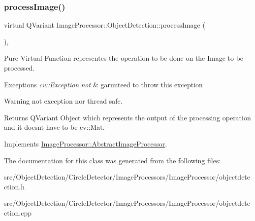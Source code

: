 \subsubsection{\texorpdfstring{process\+Image()}{processImage()}\hspace{0.1cm}{\footnotesize\ttfamily [2/2]}}
{\footnotesize\ttfamily virtual Q\+Variant Image\+Processor\+::\+Object\+Detection\+::process\+Image (\begin{DoxyParamCaption}{ }\end{DoxyParamCaption})\hspace{0.3cm}{\ttfamily [override]}, {\ttfamily [virtual]}}



Pure Virtual Function representes the operation to be done on the Image to be processed. 


\begin{DoxyExceptions}{Exceptions}
{\em cv\+::\+Exception.\+not} & garunteed to throw this exception \\
\hline
\end{DoxyExceptions}
\begin{DoxyWarning}{Warning}
not exception nor thread safe. 
\end{DoxyWarning}
\begin{DoxyReturn}{Returns}
Q\+Variant Object which represents the output of the processing operation and it doesn\textquotesingle{}t have to be cv\+::\+Mat. 
\end{DoxyReturn}


Implements \hyperlink{class_image_processor_1_1_abstract_image_processor_ad033ae911918b0f6842b7b1d6cdd2b90}{Image\+Processor\+::\+Abstract\+Image\+Processor}.



The documentation for this class was generated from the following files\+:\begin{DoxyCompactItemize}
\item 
src/\+Object\+Detection/\+Circle\+Detector/\+Image\+Processors/\+Image\+Processor/objectdetection.\+h\item 
src/\+Object\+Detection/\+Circle\+Detector/\+Image\+Processors/\+Image\+Processor/objectdetection.\+cpp\end{DoxyCompactItemize}
